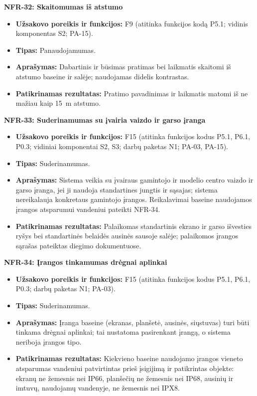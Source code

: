 \noindent\textbf{NFR-32: Skaitomumas iš atstumo}
\begin{itemize}
    \item \textbf{Užsakovo poreikis ir funkcijos:} F9 (atitinka funkcijos kodą P5.1; vidinis komponentas S2; PA-15).
    \item \textbf{Tipas:} Panaudojamumas.
    \item \textbf{Aprašymas:} Dabartinis ir būsimas pratimas bei laikmatis skaitomi iš atstumo baseine ir salėje; naudojamas didelis kontrastas.
    \item \textbf{Patikrinamas rezultatas:} Pratimo pavadinimas ir laikmatis matomi iš ne mažiau kaip 15~m atstumo.
\end{itemize}

\noindent\textbf{NFR-33: Suderinamumas su įvairia vaizdo ir garso įranga}
\begin{itemize}
    \item \textbf{Užsakovo poreikis ir funkcijos:} F15 (atitinka funkcijos kodus P5.1, P6.1, P0.3; vidiniai komponentai S2, S3; darbų paketas N1; PA-03, PA-15).
    \item \textbf{Tipas:} Suderinamumas.
    \item \textbf{Aprašymas:} Sistema veikia su įvairaus gamintojo ir modelio centro vaizdo ir garso įranga, jei ji naudoja standartines jungtis ir sąsajas; sistema nereikalauja konkretaus gamintojo įrangos. Reikalavimai baseine naudojamos įrangos atsparumui vandeniui pateikti NFR-34.
    \item \textbf{Patikrinamas rezultatas:} Palaikomas standartinis ekrano ir garso išvesties ryšys bei standartinės belaidės ausinės sausoje salėje; palaikomos įrangos sąrašas pateiktas diegimo dokumentuose.
\end{itemize}


\noindent\textbf{NFR-34: Įrangos tinkamumas drėgnai aplinkai}
\begin{itemize}
    \item \textbf{Užsakovo poreikis ir funkcijos:} F15 (atitinka funkcijos kodus P5.1, P6.1, P0.3; darbų paketas N1; PA-03).
    \item \textbf{Tipas:} Suderinamumas.
    \item \textbf{Aprašymas:} Įranga baseine (ekranas, planšetė, ausinės, siųstuvas) turi būti tinkama drėgnai aplinkai; tai nustatoma pasirenkant įrangą, o sistema neriboja įrangos tipo.
    \item \textbf{Patikrinamas rezultatas:} Kiekvieno baseine naudojamo įrangos vieneto atsparumas vandeniui patvirtintas prieš įsigijimą ir patikrintas objekte: ekranų ne žemesnis nei IP66, planšečių ne žemesnis nei IP68, ausinių ir imtuvų, naudojamų vandenyje, ne žemesnis nei IPX8.
\end{itemize}
 


